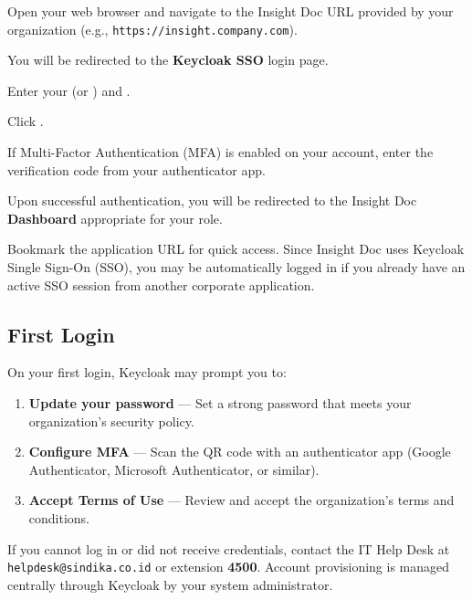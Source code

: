 \begin{ugSteps}
  \item Open your web browser and navigate to the Insight Doc URL
        provided by your organization
        (e.g., \texttt{https://insight.company.com}).
  \item You will be redirected to the \textbf{Keycloak SSO}
        login page.
  \item Enter your  (or )
        and .
  \item Click .
  \item If Multi-Factor Authentication (MFA) is enabled on your
        account, enter the verification code from your
        authenticator app.
  \item Upon successful authentication, you will be redirected
        to the Insight Doc \textbf{Dashboard} appropriate for
        your role.
\end{ugSteps}

\begin{ugTip}
  Bookmark the application URL for quick access. Since Insight Doc
  uses Keycloak Single Sign-On (SSO), you may be automatically
  logged in if you already have an active SSO session from another
  corporate application.
\end{ugTip}

\subsection{First Login}

On your first login, Keycloak may prompt you to:

\begin{enumerate}[leftmargin=18pt]
  \item \textbf{Update your password} --- Set a strong password
        that meets your organization's security policy.
  \item \textbf{Configure MFA} --- Scan the QR code with an
        authenticator app (Google Authenticator, Microsoft
        Authenticator, or similar).
  \item \textbf{Accept Terms of Use} --- Review and accept the
        organization's terms and conditions.
\end{enumerate}

\begin{ugWarning}
  If you cannot log in or did not receive credentials, contact the
  IT Help Desk at \texttt{helpdesk@sindika.co.id} or extension
  \textbf{4500}. Account provisioning is managed centrally through
  Keycloak by your system administrator.
\end{ugWarning}

